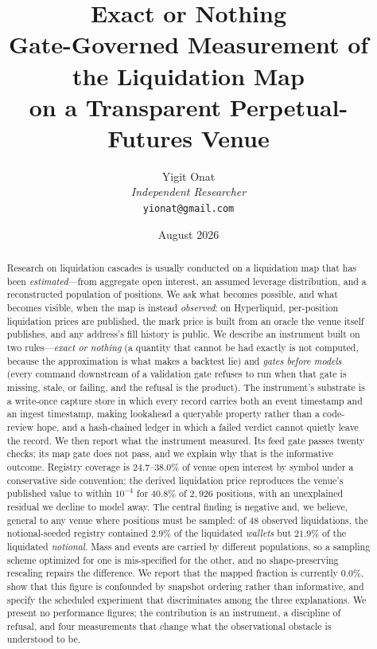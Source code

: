 \documentclass[11pt,a4paper]{article}
\theoremstyle{definition}
\theoremstyle{plain}
\begin{document}
\title{\textbf{Exact or Nothing}\\[6pt]
\large Gate-Governed Measurement of the Liquidation Map\\
on a Transparent Perpetual-Futures Venue}

\author{Yigit Onat\\
\textit{Independent Researcher}\\
\texttt{yionat@gmail.com}}
\date{August 2026}
\maketitle

\begin{abstract}
Research on liquidation cascades is usually conducted on a liquidation map that has been
\emph{estimated}---from aggregate open interest, an assumed leverage distribution, and a reconstructed
population of positions. We ask what becomes possible, and what becomes visible, when the map is
instead \emph{observed}: on Hyperliquid, per-position liquidation prices are published, the mark price
is built from an oracle the venue itself publishes, and any address's fill history is public. We
describe an instrument built on two rules---\emph{exact or nothing} (a quantity that cannot be had
exactly is not computed, because the approximation is what makes a backtest lie) and \emph{gates
before models} (every command downstream of a validation gate refuses to run when that gate is
missing, stale, or failing, and the refusal is the product). The instrument's substrate is a
write-once capture store in which every record carries both an event timestamp and an ingest
timestamp, making lookahead a queryable property rather than a code-review hope, and a hash-chained
ledger in which a failed verdict cannot quietly leave the record. We then report what the instrument
measured. Its feed gate passes twenty checks; its map gate does not pass, and we explain why that is
the informative outcome. Registry coverage is $24.7$--$38.0\%$ of venue open interest by symbol under
a conservative side convention; the derived liquidation price reproduces the venue's published value
to within $10^{-4}$ for $40.8\%$ of $2{,}926$ positions, with an unexplained residual we decline to
model away. The central finding is negative and, we believe, general to any venue where positions must
be sampled: of $48$ observed liquidations, the notional-seeded registry contained $2.9\%$ of the
liquidated \emph{wallets} but $21.9\%$ of the liquidated \emph{notional}. Mass and events are carried
by different populations, so a sampling scheme optimized for one is mis-specified for the other, and
no shape-preserving rescaling repairs the difference. We report that the mapped fraction is currently
$0.0\%$, show that this figure is confounded by snapshot ordering rather than informative, and specify
the scheduled experiment that discriminates among the three explanations. We present no performance
figures; the contribution is an instrument, a discipline of refusal, and four measurements that
change what the observational obstacle is understood to be.
\end{abstract}
\end{document}
